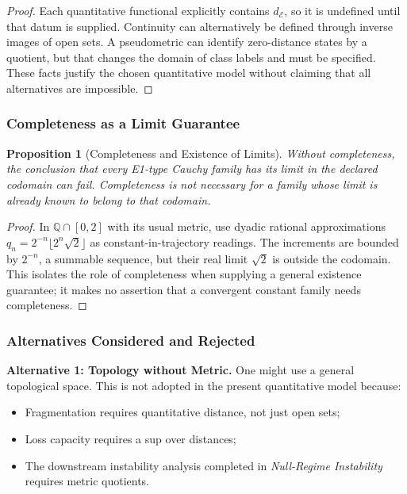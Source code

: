 \documentclass[11pt,a4paper]{article}
\theoremstyle{plain}
\newtheorem{proposition}[theorem]{Proposition}
\theoremstyle{definition}
\theoremstyle{remark}
\begin{document}
\begin{proof}
Each quantitative functional explicitly contains $d_{\mathcal E}$, so it is undefined until that datum is supplied. Continuity can alternatively be defined through inverse images of open sets. A pseudometric can identify zero-distance states by a quotient, but that changes the domain of class labels and must be specified. These facts justify the chosen quantitative model without claiming that all alternatives are impossible.
\end{proof}

\subsubsection{Completeness as a Limit Guarantee}

\begin{proposition}[Completeness and Existence of Limits]\label{prop:complete-necessary}
Without completeness, the conclusion that every E1-type Cauchy family has its limit in the declared codomain can fail. Completeness is not necessary for a family whose limit is already known to belong to that codomain.
\end{proposition}

\begin{proof}
In $\mathbb Q\cap[0,2]$ with its usual metric, use dyadic rational approximations $q_n=2^{-n}\lfloor2^n\sqrt2\rfloor$ as constant-in-trajectory readings. The increments are bounded by $2^{-n}$, a summable sequence, but their real limit $\sqrt2$ is outside the codomain. This isolates the role of completeness when supplying a general existence guarantee; it makes no assertion that a convergent constant family needs completeness.
\end{proof}

\subsubsection{Alternatives Considered and Rejected}

\textbf{Alternative 1: Topology without Metric.}
One might use a general topological space. This is not adopted in the present quantitative model because:
\begin{itemize}[leftmargin=*]
    \item Fragmentation requires quantitative distance, not just open sets;
    \item Loss capacity requires a sup over distances;
    \item The downstream instability analysis completed in \textit{Null-Regime Instability} requires metric quotients.
\end{itemize}
\end{document}
